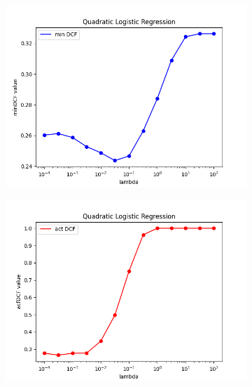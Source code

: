 \begin{figure}[h!]
    \centering
    \begin{subfigure}[b]{0.30\linewidth}
        \includegraphics[width=\linewidth]{Lab/08. Lab 08/Images/14. QLR - minDCF}
        \label{fig:QLRminDCF}
    \end{subfigure}
    \begin{subfigure}[b]{0.30\linewidth}
        \includegraphics[width=\linewidth]{Lab/08. Lab 08/Images/15. QLR - actDCF }
        \label{fig:QLRactDCF}
    \end{subfigure}
    \begin{subfigure}[b]{0.30\linewidth}

\end{subfigure}
\end{figure}
